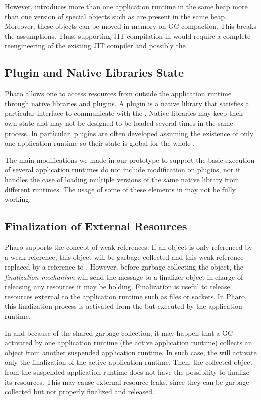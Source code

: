 However, \Vtt introduces more than one application runtime in the same heap \eg more than one version of special objects such as  are present in the same heap. Moreover, these objects can be moved in memory on GC compaction. This breaks the \JIT assumptions. Thus, supporting JIT compilation in \Vtt would require a complete reengineering of the existing JIT compiler and possibly the \VM.

\subsection{Plugin and Native Libraries State}

Pharo \VM allows one to access resources from outside the application runtime through native libraries and \VM plugins. A \VM plugin is a native library that satisfies a particular interface to communicate with the \VM. Native libraries may keep their own state and may not be designed to be loaded several times in the same process. In particular, \VM plugins are often developed assuming the existence of only one application runtime so their state is global for the whole \VM.

The main \VM modifications we made in our prototype to support the basic execution of several application runtimes do not include modification on \VM plugins, nor it handles the case of loading multiple versions of the same native library from different runtimes. The usage of some of these elements in \Vtt may not be fully working.

\subsection{Finalization of External Resources}

Pharo \VM supports the concept of weak references. If an object is only referenced by a weak reference, this object will be garbage collected and this weak reference replaced by a reference to . However, before garbage collecting the object, the \emph{finalization mechanism} will send the  message to a finalizer object in charge of releasing any resources it may be holding. Finalization is useful to release resources external to the application runtime such as files or sockets. In Pharo, this finalization process is activated from the \VM but executed by the application runtime.

In \Vtt and because of the shared garbage collection, it may happen that a GC activated by one application runtime (the active application runtime) collects an object from another suspended application runtime. In such case, the \VM will activate only the finalization of the active application runtime. Then, the collected object from the suspended application runtime does not have the possibility to finalize its resources. This may cause external resource leaks, since they can be garbage collected but not properly finalized and released.
